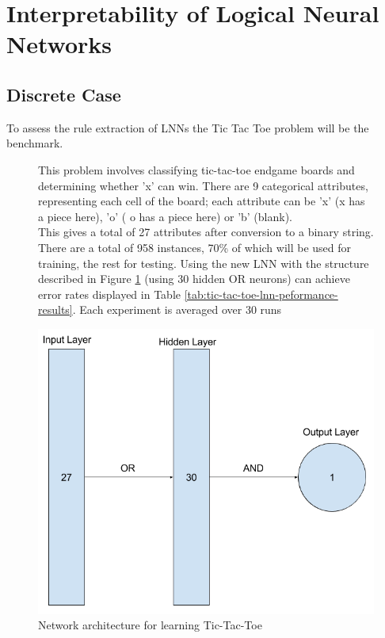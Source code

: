 \section{Interpretability of Logical Neural Networks}
\subsection{Discrete Case}
To assess the rule extraction of LNNs the Tic Tac Toe  \cite{Lichman:2013} problem will be the benchmark. 


\begin{figure}[H]
	\centering
	\begin{minipage}[t]{0.5\textwidth}
		\vspace{0px}
		This problem involves classifying tic-tac-toe endgame boards and determining whether 'x' can win. There are 9 categorical attributes, representing each cell of the board; each attribute can be 'x' (x has a piece here), 'o' ( o has a piece here) or 'b' (blank).\\
	
		This gives a total of 27 attributes after conversion to a binary string. There are a total of 958 instances, 70\% of which will be used for training, the rest for testing.  Using the new LNN with the structure described in Figure \ref{fig:tic-tac-toe-net} (using 30 hidden OR neurons) can achieve error rates displayed in Table \ref{tab:tic-tac-toe-lnn-peformance-results}. Each experiment is averaged over 30 runs
	\end{minipage}
	\hspace{1px}
	\begin{minipage}[t]{0.48\textwidth}
		\vspace{0px}
		\includegraphics[width=\textwidth]{Tic-Tac-Toe-Net.png}
		\caption{Network architecture for learning Tic-Tac-Toe}
		\label{fig:tic-tac-toe-net}
	\end{minipage}
	\hfill
\end{figure}



